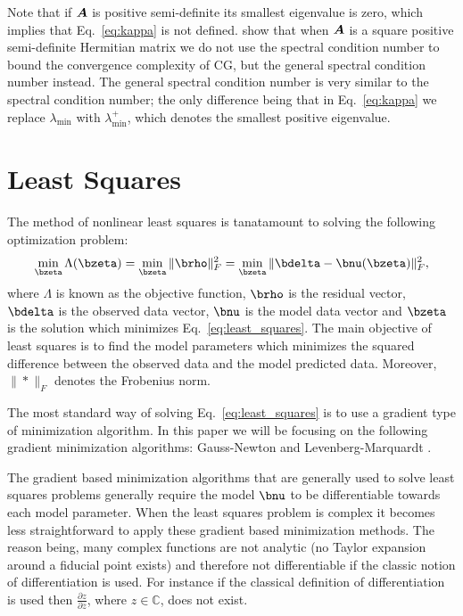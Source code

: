 \documentclass[useAMS,usenatbib]{mn2e}
\newcommand{\bA}{\bmath{A}}
\newcommand{\conj}[1]{\overline{#1}}
\begin{document}
Note that if $\bA$ is positive semi-definite its smallest eigenvalue is zero, which implies that Eq.~\eqref{eq:kappa} is not defined. \citet{Lu2015} show that when $\bA$
is a square positive semi-definite Hermitian matrix we do not use the spectral condition number to bound the convergence complexity of CG, but the general spectral condition
number instead. The general spectral condition number is very similar to the spectral condition number; the only difference being that in Eq.~\eqref{eq:kappa} we replace  
$\lambda_{\textrm{min}}$ with $\lambda_{\textrm{min}}^+$, which denotes the smallest positive eigenvalue. 

\section{Least Squares}
The method of nonlinear least squares is tanatamount to solving the following optimization problem:  
\begin{equation}
\label{eq:least_squares}
\min_{\bzeta} \Lambda(\bzeta) = \min_{\bzeta} \|\brho\|_F^2 = \min_{\bzeta} \|\bdelta - \bnu(\bzeta)\|_F^2, 
\end{equation}
where $\Lambda$ is known as the objective function, $\brho$ is the residual vector, $\bdelta$ is the observed data vector, $\bnu$ is the model data vector and $\bzeta$ is the solution which minimizes Eq.~\eqref{eq:least_squares}.
The main objective of least squares is to find the model parameters which minimizes the squared difference between the observed data and the model predicted data. Moreover, $\|*\|_F$ denotes the 
Frobenius norm.

The most standard way of solving Eq.~\eqref{eq:least_squares} is to use a gradient type of minimization algorithm. In this paper we will be focusing on the following gradient minimization algorithms: Gauss-Newton and Levenberg-Marquardt \citep{Levenberg1944,Marquardt1963}. 

The gradient based minimization algorithms that are generally used to solve least squares problems generally require the model $\bnu$ to be differentiable
towards each model parameter. When the least squares problem is complex it becomes less straightforward to apply these gradient based minimization methods. The reason being,
many complex functions are not analytic (no Taylor expansion around a fiducial point exists) and therefore not differentiable if the classic notion of differentiation is used. For instance if the 
classical definition of differentiation is used then $\frac{\partial z}{\partial \conj{z}}$, where $z \in \mathbb{C}$, does not exist.
\end{document}
